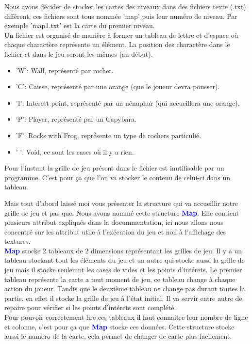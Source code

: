 \documentclass[french, 12pt]{article}
\begin{document}
        Nous avons décider de stocker les cartes des niveaux dans des fichiers texte (.txt) différent, ces fichiers sont tous nommée 'map' puis leur numéro de niveau. Par exemple 'map1.txt' est la carte du premier niveau. \\
        Un fichier est organisé de manière à former un tableau de lettre et d'espace où chaque charactère représente un élément. La position des charactère dans le fichier et dans le jeu seront les mêmes (au début).
        \begin{itemize}
            \item 'W': Wall, représenté par rocher.
            \item 'C': Caisse, représenté par une orange (que le joueur devra pousser).
            \item 'I': Interest point, représenté par un nénuphar (qui accueillera une orange).
            \item 'P': Player, représenté par un Capybara.
            \item 'F': Rocks with Frog, représente un type de rochers particulié.
            \item ' ': Void, ce sont les cases où il y a rien.\\
        \end{itemize}

        Pour l'instant la grille de jeu présent dans le fichier est inutilisable par un programme. C'est pour ça que l'on va stocker le contenu de celui-ci dans un tableau.

        Mais tout d'abord laissé moi vous présenter la structure qui va accueillir notre grille de jeu et pas que. Nous avons nommé cette structure \textcolor{blue}{\textbf{Map}}. Elle contient plusieurs attribut expliqués dans la {docummentation}, ici nous allons nous concentré sur les attribut utile à l'exécution du jeu et non à l'affichage des textures. \\

        \textcolor{blue}{\textbf{Map}} stocke 2 tableaux de 2 dimensions représentant les grilles de jeu. Il y a un tableau stockant tout les éléments du jeu et un autre qui stocke aussi la grille de jeu mais il stocke seulemnt les cases de vides et les points d'intérets. Le premier tableau représente la carte a tout moment de jeu, ce tableau change à chaque action du joueur. Tandis que le deuxième tableau ne change pas durant toutes la partie, en effet il stocke la grille de jeu à l'état initial. Il va servir entre autre de repaire pour vérifier si les points d'intérets sont complété.\\
        Pour pouvoir correctement lire ces tableaux il faut connaitre leur nombre de ligne et colonne, c'est pour ça que \textcolor{blue}{\textbf{Map}} stocke ces données. Cette structure stocke aussi le numéro de la carte, cela permet de changer de carte plus facilement.
\end{document}
